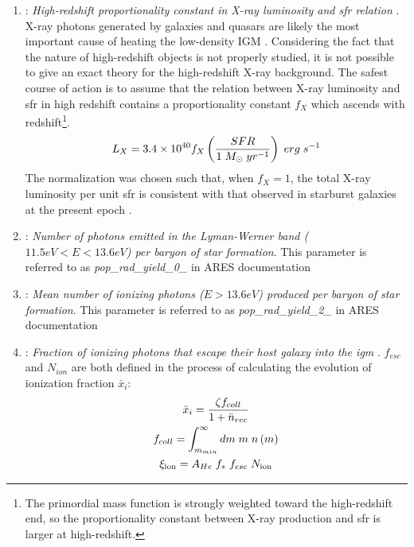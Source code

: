 \documentclass[%
 reprint,
 amsmath,amssymb,
 aps,
]{revtex4-2}
\begin{document}
\begin{enumerate}
    \item {}: \emph{High-redshift proportionality constant in X-ray luminosity and \gls{sfr} relation} \cite{ares_documentation}. 
    X-ray photons generated by galaxies and quasars are likely the most important cause of heating the low-density IGM \cite{low_frequency}. Considering the fact that the nature of high-redshift objects is not properly studied, it is not possible to give an exact theory for the high-redshift X-ray background. The safest course of action is to assume that the relation between X-ray luminosity and \gls{sfr} in high redshift contains a proportionality constant $f_X$ which ascends with redshift\footnote{The primordial mass function is strongly weighted toward the high-redshift end, so the proportionality constant between X-ray production and \gls{sfr} is larger at high-redshift.}.
    \begin{equation}
        L_X = 3.4 \times 10^{40} f_X \left( \frac{SFR}{1 \hspace{0.1cm} M_{\odot} \hspace{0.1cm} yr^{-1}}\right) \hspace{0.1cm} erg \hspace{0.1cm}s^{-1}
    \end{equation}
    The normalization was chosen such that, when $f_X =1$, the total X-ray luminosity per unit \gls{sfr} is consistent with that observed in starburst galaxies at the present epoch \cite{low_frequency, 21century}.
    
    \item {}: \emph{Number of photons emitted in the Lyman-Werner band ($11.5eV<E<13.6eV$) per baryon of star formation}. This parameter is referred to as \emph{pop\_rad\_yield\_0\_} in ARES documentation \cite{ares_documentation, lw_background}
    
    \item {}: \emph{Mean number of ionizing photons ($E>13.6eV$) produced per baryon of star formation}. This parameter is referred to as \emph{pop\_rad\_yield\_2\_} in ARES documentation \cite{ares_documentation, 21century}
    
    \item {}: \emph{Fraction of ionizing photons that escape their host galaxy into the \gls{igm}} \cite{ares_documentation}.
    $f_{esc}$ and $N_{ion}$ are both defined in the process of calculating the evolution of ionization fraction $\bar{x}_i$:
    \begin{gather}
        \bar{x}_i = \frac{\zeta f_{coll}}{1 + \bar{n}_{rec}}\\
        f_{coll} = \int_{m_{min}}^\infty dm \hspace{0.1cm} m \hspace{0.1cm} n\left(m\right)\\
        \xi_{\text{ion}} = A_{He} \hspace{0.1cm} f_* \hspace{0.1cm} f_{esc} \hspace{0.1cm} N_{\text{ion}} \label{eq:ionizing_efficiency}
    \end{gather}
    

\end{enumerate}
\end{document}
